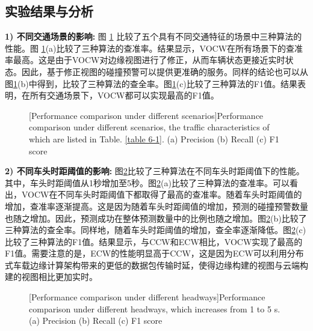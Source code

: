 \subsection[\hspace{-2pt}实验结果与分析]{{ \hspace{-8pt}实验结果与分析}}

\textbf{1) 不同交通场景的影响:}
图 \ref{fig 5-4} 比较了五个具有不同交通特征的场景中三种算法的性能。图 \ref{fig 5-4}(a)比较了三种算法的查准率。结果显示，VOCW在所有场景下的查准率最高。这是由于VOCW对边缘视图进行了修正，从而车辆状态更接近实时状态。因此，基于修正视图的碰撞预警可以提供更准确的服务。同样的结论也可以从图\ref{fig 5-4}(b)中得到，比较了三种算法的查全率。图\ref{fig 5-4}(c)比较了三种算法的F1值。结果表明，在所有交通场景下，VOCW都可以实现最高的F1值。

\begin{figure}[h]
     \centering
     [Performance comparison under different scenarios]{Performance comparison under different scenarios, the traffic characteristics of which are listed in Table. \ref{table 6-1}. (a) Precision (b) Recall (c) F1 score}
     \label{fig 5-4}
\end{figure}

\textbf{2) 不同车头时距阈值的影响:}
图\ref{fig 5-5}比较了三种算法在不同车头时距阈值下的性能。其中，车头时距阈值从1秒增加至5秒。图\ref{fig 5-5}(a)比较了三种算法的查准率。可以看出，VOCW在不同车头时距阈值下都取得了最高的查准率。随着车头时距阈值的增加，查准率逐渐提高。这是因为随着车头时距阈值的增加，预测的碰撞预警数量也随之增加。因此，预测成功在整体预测数量中的比例也随之增加。图\ref{fig 5-5}(b)比较了三种算法的查全率。同样地，随着车头时距阈值的增加，查全率逐渐降低。图\ref{fig 5-5}(c)比较了三种算法的F1值。结果显示，与CCW和ECW相比，VOCW实现了最高的F1值。需要注意的是，ECW的性能明显高于CCW，这是因为ECW可以利用分布式车载边缘计算架构带来的更低的数据包传输时延，使得边缘构建的视图与云端构建的视图相比更加实时。

\begin{figure}[h]
     \centering
     [Performance comparison under different headways]{Performance comparison under different headways, which increases from 1 to 5 s. (a) Precision (b) Recall (c) F1 score}
     \label{fig 5-5}
\end{figure}

